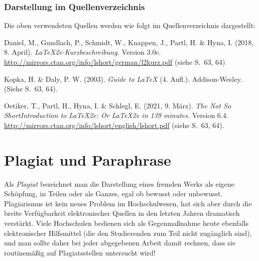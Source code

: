 \subsubsection{Darstellung im Quellenverzeichnis}

\begin{sloppypar}
Die oben verwendeten Quellen werden wie folgt im Quellenverzeichnis dargestellt:
%
\begin{list}{}{
\setlength{\leftmargin}{1.3cm}
\setlength{\itemindent}{-1.3cm}
\setlength{\itemsep}{-0.15cm}
}
\item
Daniel, M., Gundlach, P., Schmidt, W., Knappen, J., Partl, H. \& Hyna, I.
(2018, 8. April).
\textit{\LaTeX2e-Kurzbeschreibung.} Version 3.0c.
\textrm{\url{http://mirrors.ctan.org/info/lshort/german/l2kurz.pdf}}
(siehe S.\ 63, 64)
\item
Kopka, H. \& Daly, P. W. (2003). \textit{Guide to \LaTeX} (4. Aufl.).
Addison-Wesley. (Siehe S.\ 63, 64).
\item
Oetiker, T., Partl, H., Hyna, I. \& Schlegl, E. (2021, 9. März). \textit{The
Not So ShortIntroduction to \LaTeX2e: Or \LaTeX2e in 139 minutes.} Version 6.4.
\url{http://mirrors.ctan.org/info/lshort/english/lshort.pdf} (siehe S.\
63, 64).
\end{list}
\end{sloppypar}


\section{Plagiat und Paraphrase}
\label{sec:Plagiarismus}

Als \emph{Plagiat} bezeichnet man die Darstellung eines fremden Werks als
eigene Schöpfung, in Teilen oder als Ganzes, egal ob bewusst oder unbewusst.
Plagiarismus ist kein neues Problem im Hochschulwesen, hat sich aber durch
die breite Verfügbarkeit elektronischer Quellen in den letzten Jahren
dramatisch verstärkt. 
Viele Hochschulen bedienen sich als Gegenmaßnahme heute ebenfalls
elektronischer Hilfsmittel (die den Studierenden zum Teil nicht zugänglich
sind), und man sollte daher bei jeder abgegebenen Arbeit damit rechnen, dass
sie routinemäßig auf Plagiatsstellen untersucht wird!

